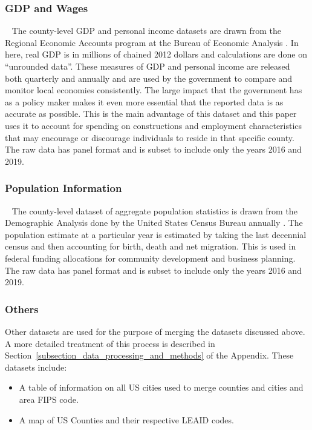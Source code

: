 \subsubsection{GDP and Wages} 
The county-level GDP and personal income datasets are drawn from the Regional Economic Accounts program at the Bureau of Economic Analysis \cite{BEA} \cite{BEA2}. In here, real GDP is in millions of chained 2012 dollars and calculations are done on “unrounded data”. These measures of GDP and personal income are released both quarterly and annually and are used by the government to compare and monitor local economies consistently. The large impact that the government has as a policy maker makes it even more essential that the reported data is as accurate as possible. This is the main advantage of this dataset and this paper uses it to account for spending on constructions and employment characteristics that may encourage or discourage individuals to reside in that specific county. The raw data has panel format and is subset to include only the years 2016 and 2019. 

\subsubsection{Population Information} 
The county-level dataset of aggregate population statistics is drawn from the Demographic Analysis done by the United States Census Bureau annually \cite{CDA}. The population estimate at a particular year is estimated by taking the last decennial census and then accounting for birth, death and net migration. This is used in federal funding allocations for community development and business planning. The raw data has panel format and is subset to include only the years 2016 and 2019. 

\subsubsection{Others} 
Other datasets are used for the purpose of merging the datasets discussed above. A more detailed treatment of this process is described in Section~\ref{subsection_data_processing_and_methods} of the Appendix. These datasets include:

\begin{itemize}

    \item A table of information on all US cities used to merge counties and cities and area FIPS code. \cite{QCEW}

    \item A map of US Counties and their respective LEAID codes. \cite{EDF}

\end{itemize}

